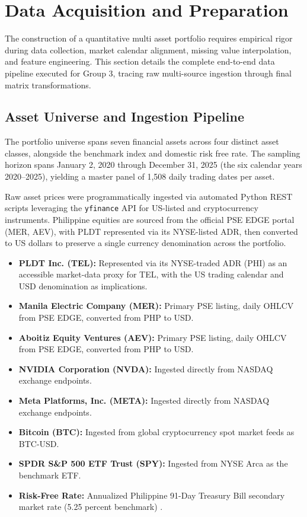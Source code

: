 \section{Data Acquisition and Preparation}

The construction of a quantitative multi asset portfolio requires empirical rigor during data collection, market calendar alignment, missing value interpolation, and feature engineering. This section details the complete end-to-end data pipeline executed for Group 3, tracing raw multi-source ingestion through final matrix transformations.

\subsection{Asset Universe and Ingestion Pipeline}

The portfolio universe spans seven financial assets across four distinct asset classes, alongside the benchmark index and domestic risk free rate. The sampling horizon spans January 2, 2020 through December 31, 2025 (the six calendar years 2020--2025), yielding a master panel of 1,508 daily trading dates per asset.

Raw asset prices were programmatically ingested via automated Python REST scripts leveraging the \texttt{yfinance} API \parencite{yahoo_finance} for US-listed and cryptocurrency instruments. Philippine equities are sourced from the official PSE EDGE portal \parencite{pse_edge} (MER, AEV), with PLDT represented via its NYSE-listed ADR, then converted to US dollars to preserve a single currency denomination across the portfolio.

\begin{itemize}
  \item \textbf{PLDT Inc. (TEL):} Represented via its NYSE-traded ADR (PHI) as an accessible market-data proxy for TEL, with the US trading calendar and USD denomination as implications.
  \item \textbf{Manila Electric Company (MER):} Primary PSE listing, daily OHLCV from PSE EDGE, converted from PHP to USD.
  \item \textbf{Aboitiz Equity Ventures (AEV):} Primary PSE listing, daily OHLCV from PSE EDGE, converted from PHP to USD.
  \item \textbf{NVIDIA Corporation (NVDA):} Ingested directly from NASDAQ exchange endpoints.
  \item \textbf{Meta Platforms, Inc. (META):} Ingested directly from NASDAQ exchange endpoints.
  \item \textbf{Bitcoin (BTC):} Ingested from global cryptocurrency spot market feeds as BTC-USD.
  \item \textbf{SPDR S\&P 500 ETF Trust (SPY):} Ingested from NYSE Arca as the benchmark ETF.
  \item \textbf{Risk-Free Rate:} Annualized Philippine 91-Day Treasury Bill secondary market rate (5.25 percent benchmark) \parencite{bsp_tbill}.
\end{itemize}

